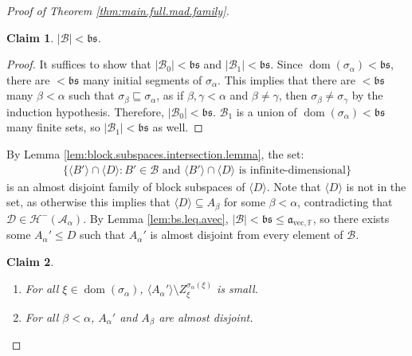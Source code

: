 \documentclass[11pt,reqno]{amsart}
\theoremstyle{plain}
\numberwithin{equation}{section}
\newtheorem{claim}{Claim}
\theoremstyle{definition}
\newcommand{\func}{\operatorname}
\renewcommand{\c}[1]{\langle #1 \rangle}
\newcommand{\cal}{\mathcal}
\renewcommand{\frak}{\mathfrak}
\newcommand{\dom}{\func{dom}}
\newcommand{\A}{\cal{A}}
\newcommand{\B}{\cal{B}}
\renewcommand{\H}{\cal{H}}
\newcommand{\D}{\cal{D}}
\newcommand{\avec}{\frak{a}_{\mathrm{vec},\mathbb{F}}}
\newenvironment{midproof}[1][Proof]
  {\begin{proof}[#1]\renewcommand{\qedsymbol}{$\blacksquare$}}
  {\end{proof}}
\begin{document}
\begin{proof}[Proof of Theorem \ref{thm:main.full.mad.family}]
    \begin{claim}
    \label{claim:B.smaller.than.bs}
        $|\B| < \frak{bs}$.
    \end{claim}

    \begin{midproof}
        It suffices to show that $|\B_0| < \frak{bs}$ and $|\B_1| < \frak{bs}$. Since $\dom(\sigma_\alpha) < \frak{bs}$, there are $<\frak{bs}$ many initial segments of $\sigma_\alpha$. This implies that there are $<\frak{bs}$ many $\beta < \alpha$ such that $\sigma_\beta \sqsubseteq \sigma_\alpha$, as if $\beta,\gamma < \alpha$ and $\beta \neq \gamma$, then $\sigma_\beta \neq \sigma_\gamma$ by the induction hypothesis. Therefore, $|\B_0| < \frak{bs}$. $\B_1$ is a union of $\dom(\sigma_\alpha) < \frak{bs}$ many finite sets, so $|\B_1| < \frak{bs}$ as well. 
    \end{midproof}

    By Lemma \ref{lem:block.subspaces.intersection.lemma},  the set:
    \begin{align*}
        \{\c{B'} \cap \c{D} : B' \in \B \text{ and } \c{B'} \cap \c{D} \text{ is infinite-dimensional}\}
    \end{align*}
    is an almost disjoint family of block subspaces of $\c{D}$. Note that $\c{D}$ is not in the set, as otherwise this implies that $\c{D} \subseteq A_\beta$ for some $\beta < \alpha$, contradicting that $\D \in \H^-(\A_\alpha)$. By Lemma \ref{lem:bs.leq.avec}, $|\B| < \frak{bs} \leq \avec$, so there exists some $A_\alpha' \leq D$ such that $A_\alpha'$ is almost disjoint from every element of $\B$. 

    \begin{claim}
        \hfill
        \begin{enumerate}
            \item For all $\xi \in \dom(\sigma_\alpha)$, $\c{A_\alpha'} \setminus Z_\xi^{\sigma_\alpha(\xi)}$ is small.

            \item For all $\beta < \alpha$, $A_\alpha'$ and $A_\beta$ are almost disjoint.
        \end{enumerate}
    \end{claim}


\end{proof}
\end{document}
